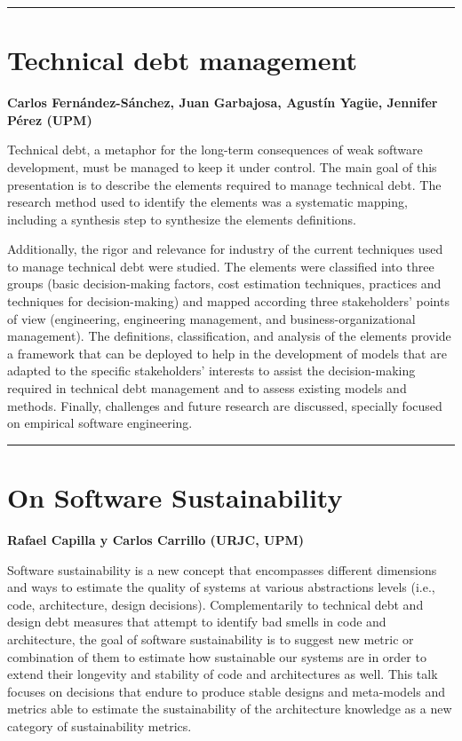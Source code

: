 \documentclass[11pt,pressrelease]{newlfm} %
\begin{document}
\begin{newlfm}
\rule{\textwidth}{1pt} \par \noindent
\section{Technical debt management}

{\bf Carlos Fern\'andez-S\'anchez, Juan Garbajosa, Agust\'in Yagüe, Jennifer P\'erez (UPM)}

Technical debt, a metaphor for the long-term consequences of weak software development, must be managed to keep it under control. The main goal of this presentation is to describe the elements required to manage technical debt. The research method used to identify the elements was a systematic mapping, including a synthesis step to synthesize the elements definitions. 

Additionally, the rigor and relevance for industry of the current techniques used to manage technical debt were studied. The elements were classified into three groups (basic decision-making factors, cost estimation techniques, practices and techniques for decision-making) and mapped according three stakeholders' points of view (engineering, engineering management, and business-organizational management). The definitions, classification, and analysis of the elements provide a framework that can be deployed to help in the development of models that are adapted to the specific stakeholders' interests to assist the decision-making required in technical debt management and to assess existing models and methods. Finally, challenges and future research are discussed, specially focused on empirical software engineering.


\rule{\textwidth}{1pt} \par \noindent
\section{On Software Sustainability}

{\bf Rafael Capilla y Carlos Carrillo (URJC, UPM)}

Software sustainability is a new concept that encompasses different dimensions and 
ways to estimate the quality of systems at various abstractions levels (i.e., code,
architecture, design decisions). Complementarily to technical debt and design debt
measures that attempt to identify bad smells in code and architecture, the goal
of software sustainability is to suggest new metric or combination of them to estimate
how sustainable our systems are in order to extend their longevity and stability
of code and architectures as well. This talk focuses on decisions that endure to produce
stable designs and meta-models and metrics able to estimate the sustainability of the
architecture knowledge as a new category of sustainability metrics.


\end{newlfm}
\end{document}
